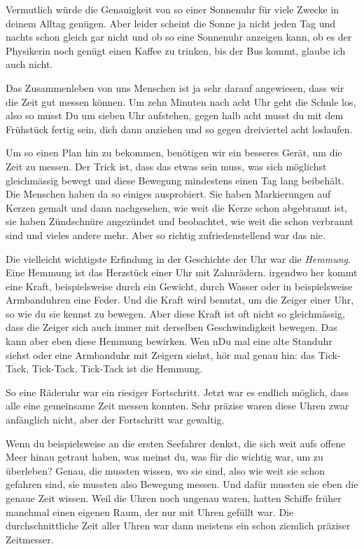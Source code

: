 Vermutlich würde die Genauigkeit von so einer Sonnenuhr für viele Zwecke in
deinem Alltag genügen. Aber leider scheint die Sonne ja nicht jeden Tag und
nachts schon gleich gar nicht und ob so eine Sonnenuhr anzeigen kann, ob es
der Physikerin noch genügt einen Kaffee zu trinken, bis der Bus kommt, glaube
ich auch nicht.

Das Zusammenleben von uns Menschen ist ja sehr darauf angewiesen, dass wir die
Zeit gut messen können. Um zehn Minuten nach acht Uhr geht die Schule los, also so musst Du um
sieben Uhr aufstehen, gegen halb acht musst du mit dem Frühstück fertig sein,
dich dann anziehen und so gegen dreiviertel acht loslaufen. 

Um so einen Plan hin zu bekommen, benötigen wir ein besseres Gerät, um die Zeit zu messen. Der Trick ist,
dass das etwas sein muss, was sich möglichst gleichmässig bewegt und diese
Bewegung mindestens einen Tag lang beibehält. Die Menschen haben da so einiges
ausprobiert. Sie haben Markierungen auf Kerzen gemalt und dann nachgesehen, wie
weit die Kerze schon abgebrannt ist, sie haben Zündschnüre angezündet und
beobachtet, wie weit die schon verbrannt sind und vieles andere mehr. Aber so
richtig zufriedenstellend war das nie.

Die vielleicht wichtigste Erfindung in der Geschichte der Uhr war die
\textit{Hemmung}. Eine Hemmung ist das Herzstück einer Uhr mit Zahnrädern.
irgendwo her kommt eine Kraft, beispielsweise durch ein Gewicht, durch Wasser
oder in beispielsweise Armbanduhren eine Feder. Und die Kraft wird benutzt, um
die Zeiger einer Uhr, so wie du sie kennst zu bewegen. Aber diese Kraft ist oft
nicht so gleichmässig, dass die Zeiger sich auch immer mit derselben
Geschwindigkeit bewegen. Das kann aber eben diese Hemmung bewirken. Wen nDu mal
eine alte Standuhr siehst oder eine Armbanduhr mit Zeigern siehst, hör mal
genau hin: das Tick-Tack, Tick-Tack, Tick-Tack ist die Hemmung. 

So eine Räderuhr war ein riesiger Fortschritt. Jetzt war es endlich möglich,
dass alle eine gemeinsame Zeit messen konnten. Sehr präzise waren diese Uhren
zwar anfänglich nicht, aber der Fortschritt war gewaltig.

Wenn du beispielsweise an die ersten Seefahrer denkst, die sich weit aufs
offene Meer hinau getraut haben, was meinst du, was für die wichtig war, um zu
überleben? Genau, die mussten wissen, wo sie sind, also wie weit sie schon
gefahren sind, sie mussten also Bewegung messen. Und dafür mussten sie eben die
genaue Zeit wissen. Weil die Uhren noch ungenau waren, hatten Schiffe früher
manchmal einen eigenen Raum, der nur mit Uhren gefüllt war. Die
durchschnittliche Zeit aller Uhren war dann meistens ein schon ziemlich
präziser Zeitmesser.

